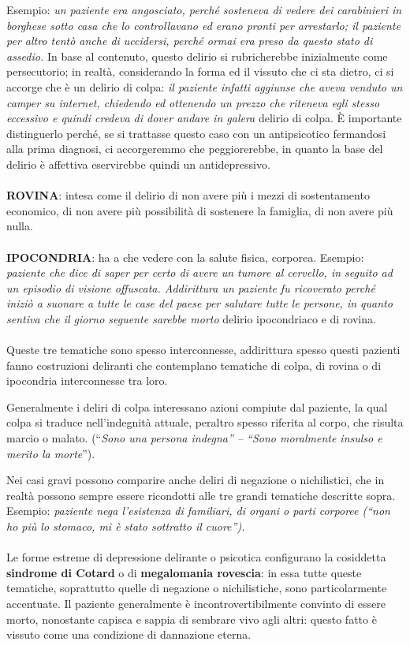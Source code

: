 \begin{itemize}
\begin{itemize}
  Esempio: \emph{un paziente era angosciato, perché sosteneva di vedere
  dei carabinieri in borghese sotto casa che lo controllavano ed erano
  pronti per arrestarlo; il paziente per altro tentò anche di uccidersi,
  perché ormai era preso da questo stato di assedio.} In base al
  contenuto, questo delirio si rubricherebbe inizialmente come
  persecutorio; in realtà, considerando la forma ed il vissuto che ci
  sta dietro, ci si accorge che è un delirio di colpa: \emph{il paziente
  infatti aggiunse che aveva venduto un camper su internet, chiedendo ed
  ottenendo un prezzo che riteneva egli stesso eccessivo e quindi
  credeva di dover andare in galera} delirio di colpa. È importante
  distinguerlo perché, se si trattasse questo caso con un antipsicotico
  fermandosi alla prima diagnosi, ci accorgeremmo che peggiorerebbe, in
  quanto la base del delirio è affettiva eservirebbe quindi un
  antidepressivo.
\\\\
  \textbf{ROVINA}: intesa come il delirio di non avere più i mezzi di
  sostentamento economico, di non avere più possibilità di sostenere la
  famiglia, di non avere più nulla.
\\\\
  \textbf{IPOCONDRIA}: ha a che vedere con la salute fisica, corporea.
  Esempio: \emph{paziente che dice di saper per certo di avere un tumore
  al cervello, in seguito ad un episodio di visione offuscata.
  Addirittura un paziente fu ricoverato perché iniziò a suonare a tutte
  le case del paese per salutare tutte le persone, in quanto sentiva che
  il giorno seguente sarebbe morto} delirio ipocondriaco e di rovina.
\\\\
  Queste tre tematiche sono spesso interconnesse, addirittura spesso
  questi pazienti fanno costruzioni deliranti che contemplano tematiche
  di colpa, di rovina o di ipocondria interconnesse tra loro.

  Generalmente i deliri di colpa interessano azioni compiute dal
  paziente, la qual colpa si traduce nell'indegnità attuale, peraltro
  spesso riferita al corpo, che risulta marcio o malato. (``\emph{Sono
  una persona indegna'' -- ``Sono moralmente insulso e merito la
  morte}'').

  Nei casi gravi possono comparire anche deliri di negazione o
  nichilistici, che in realtà possono sempre essere ricondotti alle tre
  grandi tematiche descritte sopra. Esempio: \emph{paziente nega
  l'esistenza di familiari, di organi o parti corporee (``non ho più lo
  stomaco, mi è stato sottratto il cuore''). }
\\\\
  Le forme estreme di depressione delirante o psicotica configurano la
  cosiddetta \textbf{sindrome di Cotard} o di \textbf{megalomania
  rovescia}: in essa tutte queste tematiche, soprattutto quelle di
  negazione o nichilistiche, sono particolarmente accentuate. Il
  paziente generalmente è incontrovertibilmente convinto di essere
  morto, nonostante capisca e sappia di sembrare vivo agli altri: questo
  fatto è vissuto come una condizione di dannazione eterna.


\end{itemize}
\end{itemize}
